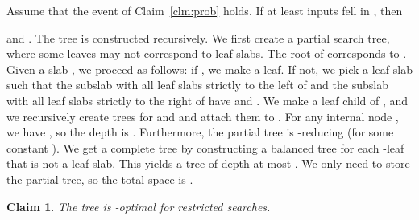 \documentclass[letterpaper,11pt]{article}
\newtheorem{claim}[theorem]{Claim}
\begin{document}
Assume that the event
of Claim~\ref{clm:prob} holds.
If at least  
inputs fell in , then 

and .
The tree  is constructed recursively.
We first create a partial search tree, where
some leaves may not correspond to leaf slabs.
The root of  corresponds to 
. Given a slab
, we proceed as follows:
if , we make
 a leaf. If not, we pick a leaf slab 
 such that the subslab 
 with all leaf slabs 
strictly to the left of  and
the subslab  with all 
leaf slabs strictly 
to the right of  have 
 and
. 
We make  a leaf child of , and 
we recursively create trees for 
 and  and attach them to . 
For any internal node , we have 
,
so the depth is . 
Furthermore,
the partial tree  is -reducing 
(for some constant ).
We get a complete tree
by constructing a balanced tree
for each -leaf that is not a leaf slab. 
This yields a tree  of depth 
at most .
We only need to store the 
partial tree, 
so the total space 
is .

\begin{claim}\label{clm:1/eps} 
  The tree  is -optimal
  for restricted searches. 
\end{claim}
\end{document}
